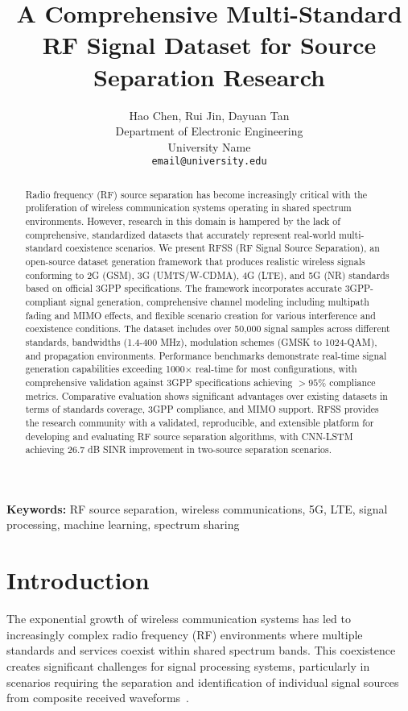 \documentclass[twocolumn,10pt]{article}
\title{\LARGE \bf A Comprehensive Multi-Standard RF Signal Dataset for Source Separation Research}
\author{
Hao Chen, Rui Jin, Dayuan Tan\\
Department of Electronic Engineering\\
University Name\\
\texttt{email@university.edu}
}
\date{}
\begin{document}
\maketitle

\begin{abstract}
Radio frequency (RF) source separation has become increasingly critical with the proliferation of wireless communication systems operating in shared spectrum environments. However, research in this domain is hampered by the lack of comprehensive, standardized datasets that accurately represent real-world multi-standard coexistence scenarios. We present RFSS (RF Signal Source Separation), an open-source dataset generation framework that produces realistic wireless signals conforming to 2G (GSM), 3G (UMTS/W-CDMA), 4G (LTE), and 5G (NR) standards based on official 3GPP specifications. The framework incorporates accurate 3GPP-compliant signal generation, comprehensive channel modeling including multipath fading and MIMO effects, and flexible scenario creation for various interference and coexistence conditions. The dataset includes over 50,000 signal samples across different standards, bandwidths (1.4-400 MHz), modulation schemes (GMSK to 1024-QAM), and propagation environments. Performance benchmarks demonstrate real-time signal generation capabilities exceeding 1000$\times$ real-time for most configurations, with comprehensive validation against 3GPP specifications achieving $>95\%$ compliance metrics. Comparative evaluation shows significant advantages over existing datasets in terms of standards coverage, 3GPP compliance, and MIMO support. RFSS provides the research community with a validated, reproducible, and extensible platform for developing and evaluating RF source separation algorithms, with CNN-LSTM achieving 26.7 dB SINR improvement in two-source separation scenarios.
\end{abstract}

\textbf{Keywords:} RF source separation, wireless communications, 5G, LTE, signal processing, machine learning, spectrum sharing

\section{Introduction}

The exponential growth of wireless communication systems has led to increasingly complex radio frequency (RF) environments where multiple standards and services coexist within shared spectrum bands. This coexistence creates significant challenges for signal processing systems, particularly in scenarios requiring the separation and identification of individual signal sources from composite received waveforms~\cite{cabric2004implementation, mitola1999cognitive}.
\end{document}
